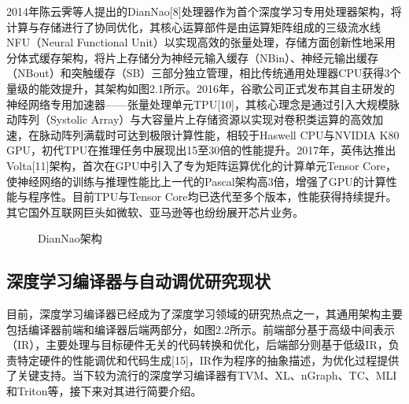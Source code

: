 \documentclass[a4paper, nosysfonts]{hpcchina}
\begin{document}
    2014年陈云霁等人提出的DianNao[8]处理器作为首个深度学习专用处理器架构，将计算与存储进行了协同优化，其核心运算部件是由运算矩阵组成的三级流水线NFU（Neural Functional Unit）以实现高效的张量处理，存储方面创新性地采用分体式缓存架构，将片上存储分为神经元输入缓存（NBin）、神经元输出缓存（NBout）和突触缓存（SB）三部分独立管理，相比传统通用处理器CPU获得3个量级的能效提升，其架构如图2.1所示。2016年，谷歌公司正式发布其自主研发的神经网络专用加速器——张量处理单元TPU[10]，其核心理念是通过引入大规模脉动阵列（Systolic Array）与大容量片上存储资源以实现对卷积类运算的高效加速，在脉动阵列满载时可达到极限计算性能，相较于Haswell CPU与NVIDIA K80 GPU，初代TPU在推理任务中展现出15至30倍的性能提升。2017年，英伟达推出Volta[11]架构，首次在GPU中引入了专为矩阵运算优化的计算单元Tensor Core，使神经网络的训练与推理性能比上一代的Pascal架构高3倍，增强了GPU的计算性能与程序性。目前TPU与Tensor Core均已迭代至多个版本，性能获得持续提升。其它国外互联网巨头如微软、亚马逊等也纷纷展开芯片业务。
    \begin{figure}[!htbp]
  \centering
  \caption{DianNao架构
  }
\end{figure}
    \subsection{深度学习编译器与自动调优研究现状}
目前，深度学习编译器已经成为了深度学习领域的研究热点之一，其通用架构主要包括编译器前端和编译器后端两部分，如图2.2所示。前端部分基于高级中间表示（IR），主要处理与目标硬件无关的代码转换和优化，后端部分则基于低级IR，负责特定硬件的性能调优和代码生成[15]，IR作为程序的抽象描述，为优化过程提供了关键支持。当下较为流行的深度学习编译器有TVM、XL、nGraph、TC、MLI和Triton等，接下来对其进行简要介绍。
\end{document}

